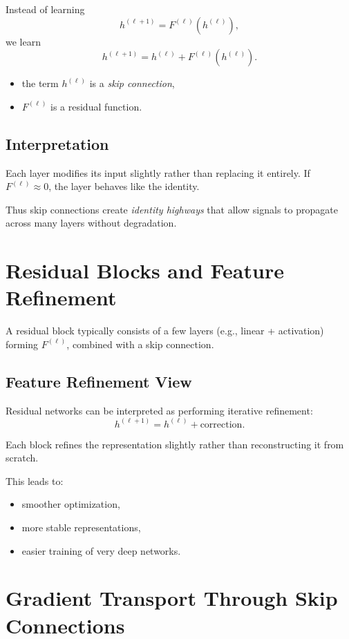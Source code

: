 Instead of learning
\[
h^{(\ell+1)} = F^{(\ell)}(h^{(\ell)}),
\]
we learn
\[
h^{(\ell+1)} = h^{(\ell)} + F^{(\ell)}(h^{(\ell)}).
\]

\begin{itemize}
    \item the term $h^{(\ell)}$ is a \emph{skip connection},
    \item $F^{(\ell)}$ is a residual function.
\end{itemize}

\subsection{Interpretation}

Each layer modifies its input slightly rather than replacing it entirely. If $F^{(\ell)} \approx 0$, the layer behaves like the identity.

Thus skip connections create \emph{identity highways} that allow signals to propagate across many layers without degradation.

\section{Residual Blocks and Feature Refinement}

A residual block typically consists of a few layers (e.g., linear + activation) forming $F^{(\ell)}$, combined with a skip connection.

\subsection{Feature Refinement View}

Residual networks can be interpreted as performing iterative refinement:
\[
h^{(\ell+1)} = h^{(\ell)} + \text{correction}.
\]

Each block refines the representation slightly rather than reconstructing it from scratch.

This leads to:
\begin{itemize}
    \item smoother optimization,
    \item more stable representations,
    \item easier training of very deep networks.
\end{itemize}

\section{Gradient Transport Through Skip Connections}

